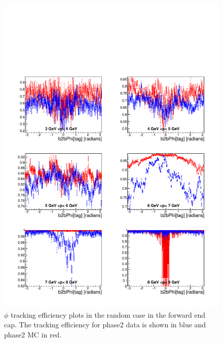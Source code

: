 \documentclass[a4paper,11pt,twosided,final,german,openbib,pdftex,listof=totoc,bibliography=totoc]{scrbook}
\begin{document}
\begin{figure}[!htbp]
	\centering
	\includegraphics[width=\textwidth]{Plots/master/xPMPhiRandomFC}
	\caption[Momentum $\phi$ Random Forward End Cap Efficiency Phase2]{$\phi$ tracking efficiency plots in the random case in the forward end cap. The tracking efficiency for phase2 data is shown in blue and phase2 MC in red.}
	\label{plt:xPMPhiRandomFC}
\end{figure}
\end{document}
